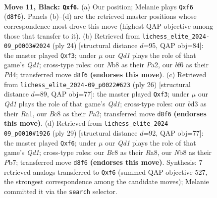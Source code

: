 \documentclass[11pt]{article}
\begin{document}
\begin{figure}[p]
\label{fig:thought-m19}
\end{figure}

\clearpage

\begin{figure}[p]\centering
\begin{subfigure}{0.46\textwidth}\centering
\resizebox{\linewidth}{!}{%
\newchessgame
\chessboard[
  setfen={rnbqr1k1/pp3ppp/3b1B2/3p4/3p4/3B1N2/PPP2PPP/RN1Q1RK1 b - - 0 11},
  showmover=false,
  pgfstyle=straightmove, color=movearrow, markmove={d8-f6}
]}
\caption{}
\end{subfigure}\hfill
\begin{subfigure}{0.46\textwidth}\centering
\resizebox{\linewidth}{!}{%
\newchessgame
\chessboard[
  setfen={r2q1rk1/1pp1nppp/p2p4/2bP4/B2P4/5b2/PP3PPP/R1BQ1RK1 w - - 0 13},
  showmover=false,
  pgfstyle=straightmove, color=movearrow, markmove={d1-f3}
]}
\caption{}
\end{subfigure}
\\[4pt]
\begin{subfigure}{0.46\textwidth}\centering
\resizebox{\linewidth}{!}{%
\newchessgame
\chessboard[
  setfen={r2q1rk1/p1p2pbp/p2p1np1/3P4/4P3/5b1P/PP3PP1/RNBQR1K1 w - - 0 14},
  showmover=false,
  pgfstyle=straightmove, color=movearrow, markmove={d1-f3}
]}
\caption{}
\end{subfigure}\hfill
\begin{subfigure}{0.46\textwidth}\centering
\resizebox{\linewidth}{!}{%
\newchessgame
\chessboard[
  setfen={r2qr1k1/1p1b1pp1/p1nb1B1p/3p4/B2N4/P1N4P/1PP2PP1/R2Q1RK1 b - - 0 15},
  showmover=false,
  pgfstyle=straightmove, color=movearrow, markmove={d8-f6}
]}
\caption{}
\end{subfigure}
\caption{\textbf{Move 11, Black: \texttt{Qxf6}.} (a) Our position; Melanie plays \texttt{Qxf6} (\texttt{d8f6}). Panels (b)--(d) are the retrieved master positions whose correspondence most drove this move (highest QAP objective among those that transfer to it). (b) Retrieved from \texttt{lichess\_elite\_2024-09\_p0003\#2024} (ply 24) [structural distance $d$=95, QAP obj=84]: the master played \texttt{Qxf3}; under $\mu$ our \emph{Qd1} plays the role of that game's \emph{Qd1}; cross-type roles: our \emph{N}b8 as their \emph{P}a2, our \emph{b}f6 as their \emph{P}d4; transferred move \texttt{d8f6} \textbf{(endorses this move)}. (c) Retrieved from \texttt{lichess\_elite\_2024-09\_p0022\#623} (ply 26) [structural distance $d$=89, QAP obj=77]: the master played \texttt{Qxf3}; under $\mu$ our \emph{Qd1} plays the role of that game's \emph{Qd1}; cross-type roles: our \emph{b}d3 as their \emph{R}a1, our \emph{B}c8 as their \emph{P}a2; transferred move \texttt{d8f6} \textbf{(endorses this move)}. (d) Retrieved from \texttt{lichess\_elite\_2024-09\_p0010\#1926} (ply 29) [structural distance $d$=92, QAP obj=77]: the master played \texttt{Qxf6}; under $\mu$ our \emph{Qd1} plays the role of that game's \emph{Qd1}; cross-type roles: our \emph{B}c8 as their \emph{R}a8, our \emph{N}b8 as their \emph{P}b7; transferred move \texttt{d8f6} \textbf{(endorses this move)}. Synthesis: 7 retrieved analogs transferred to \texttt{Qxf6} (summed QAP objective 527, the strongest correspondence among the candidate moves); Melanie committed it via the \texttt{search} selector.}

\end{figure}
\end{document}
